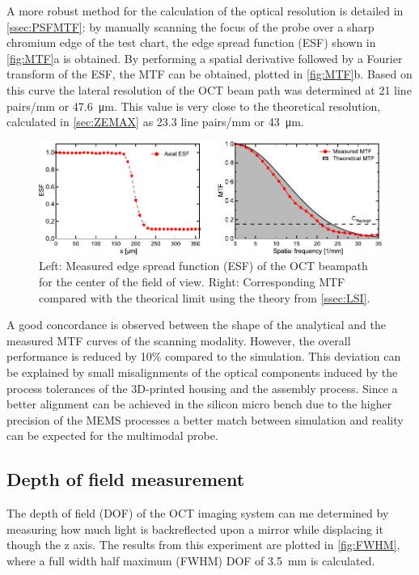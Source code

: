 \documentclass[10pt]{iopart}
\begin{document}
A more robust method for the calculation of the optical resolution is detailed in \autoref{ssec:PSFMTF}: by manually scanning the focus of the probe over a sharp chromium edge of the test chart, the edge spread function (ESF) shown in \autoref{fig:MTF}a is obtained. By performing a spatial derivative followed by a Fourier transform of the ESF, the MTF can be obtained, plotted in \autoref{fig:MTF}b. Based on this curve the lateral resolution of the OCT beam path was determined at 21 line pairs/mm or \SI{47.6}{\micro\meter}. This value is very close to the theoretical resolution, calculated in \autoref{sec:ZEMAX} as 23.3 line pairs/mm or \SI{43}{\micro\meter}.
\begin{figure}[h!]\centering \includegraphics[width=\columnwidth]{figures/confResMeas.pdf}
      \caption{Left: Measured edge spread function (ESF) of the OCT beampath for the center of the field of view. 
      Right: Corresponding MTF compared with the theorical limit using the theory from \autoref{ssec:LSI}.}
      \label{fig:MTF}
\end{figure}
A good concordance is observed between the shape of the analytical and the measured MTF curves of the scanning modality. However, the overall performance is reduced by 10\% compared to the simulation. This deviation can be explained by small misalignments of the optical components induced by the process tolerances of the 3D-printed housing and the assembly process. Since a better alignment can be achieved in the silicon micro bench due to the higher precision of the MEMS processes a better match between simulation and reality can be expected for the multimodal probe.


\subsection{Depth of field measurement}
The depth of field (DOF) of the OCT imaging system can me determined by measuring how much light is backreflected upon a mirror while displacing it though the z axis. The results from this experiment are plotted in \autoref{fig:FWHM}, where a full width half maximum (FWHM) DOF of \SI{3.5}{\milli\meter} is calculated. 
\end{document}
